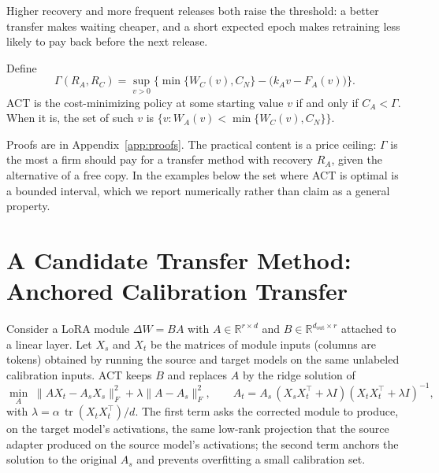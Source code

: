 \documentclass[acmsmall,review]{acmart}
\begin{document}
Higher recovery and more frequent releases both raise the threshold: a better transfer makes waiting cheaper,
and a short expected epoch makes retraining less likely to pay back before the next release.

\begin{proposition}\label{prop:act}
Define
\begin{equation}
\Gamma(R_A,R_C)=\sup_{v>0}\Big\{\min\{W_C(v),C_N\}-\big(k_Av-F_A(v)\big)\Big\}.
\end{equation}
ACT is the cost-minimizing policy at some starting value $v$ if and only if $C_A<\Gamma$. When it is, the set of such
$v$ is $\{v: W_A(v)<\min\{W_C(v),C_N\}\}$.
\end{proposition}

Proofs are in Appendix~\ref{app:proofs}. The practical content is a price ceiling: $\Gamma$ is the most a firm should
pay for a transfer method with recovery $R_A$, given the alternative of a free copy. In the examples below the
set where ACT is optimal is a bounded interval, which we report numerically rather than claim as a general property.

\section{A Candidate Transfer Method: Anchored Calibration Transfer}\label{sec:act}

Consider a LoRA module $\Delta W=BA$ with $A\in\mathbb R^{r\times d}$ and $B\in\mathbb R^{d_{\text{out}}\times r}$ attached to a
linear layer. Let $X_s$ and $X_t$ be the matrices of module inputs (columns are tokens) obtained by running the source
and target models on the same unlabeled calibration inputs. ACT keeps $B$ and replaces $A$ by the ridge solution of
\begin{equation}
\min_{A}\;\|AX_t-A_sX_s\|_F^2+\lambda\|A-A_s\|_F^2,\qquad
A_t=A_s\,(X_sX_t^{\top}+\lambda I)(X_tX_t^{\top}+\lambda I)^{-1},
\end{equation}
with $\lambda=\alpha\,\operatorname{tr}(X_tX_t^{\top})/d$. The first term asks the corrected module to produce, on the
target model's activations, the same low-rank projection that the source adapter produced on the source model's
activations; the second term anchors the solution to the original $A_s$ and prevents overfitting a small calibration
set.
\end{document}
